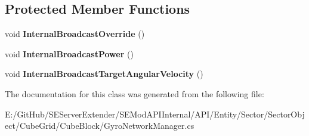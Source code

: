 \subsection*{Protected Member Functions}
\begin{DoxyCompactItemize}
\item 
\hypertarget{class_s_e_mod_a_p_i_internal_1_1_a_p_i_1_1_entity_1_1_sector_1_1_sector_object_1_1_cube_grid_1_1822c814d32081cd79efd93b6076f24a9_a7d9bad41302902f36b061ed71d1eaf5b}{}void {\bfseries Internal\+Broadcast\+Override} ()\label{class_s_e_mod_a_p_i_internal_1_1_a_p_i_1_1_entity_1_1_sector_1_1_sector_object_1_1_cube_grid_1_1822c814d32081cd79efd93b6076f24a9_a7d9bad41302902f36b061ed71d1eaf5b}

\item 
\hypertarget{class_s_e_mod_a_p_i_internal_1_1_a_p_i_1_1_entity_1_1_sector_1_1_sector_object_1_1_cube_grid_1_1822c814d32081cd79efd93b6076f24a9_a42d971ab5fa6c07bc2b59f83687da92d}{}void {\bfseries Internal\+Broadcast\+Power} ()\label{class_s_e_mod_a_p_i_internal_1_1_a_p_i_1_1_entity_1_1_sector_1_1_sector_object_1_1_cube_grid_1_1822c814d32081cd79efd93b6076f24a9_a42d971ab5fa6c07bc2b59f83687da92d}

\item 
\hypertarget{class_s_e_mod_a_p_i_internal_1_1_a_p_i_1_1_entity_1_1_sector_1_1_sector_object_1_1_cube_grid_1_1822c814d32081cd79efd93b6076f24a9_a2273342d9f0c97f028a7b773a7178ff0}{}void {\bfseries Internal\+Broadcast\+Target\+Angular\+Velocity} ()\label{class_s_e_mod_a_p_i_internal_1_1_a_p_i_1_1_entity_1_1_sector_1_1_sector_object_1_1_cube_grid_1_1822c814d32081cd79efd93b6076f24a9_a2273342d9f0c97f028a7b773a7178ff0}

\end{DoxyCompactItemize}


The documentation for this class was generated from the following file\+:\begin{DoxyCompactItemize}
\item 
E\+:/\+Git\+Hub/\+S\+E\+Server\+Extender/\+S\+E\+Mod\+A\+P\+I\+Internal/\+A\+P\+I/\+Entity/\+Sector/\+Sector\+Object/\+Cube\+Grid/\+Cube\+Block/Gyro\+Network\+Manager.\+cs\end{DoxyCompactItemize}
